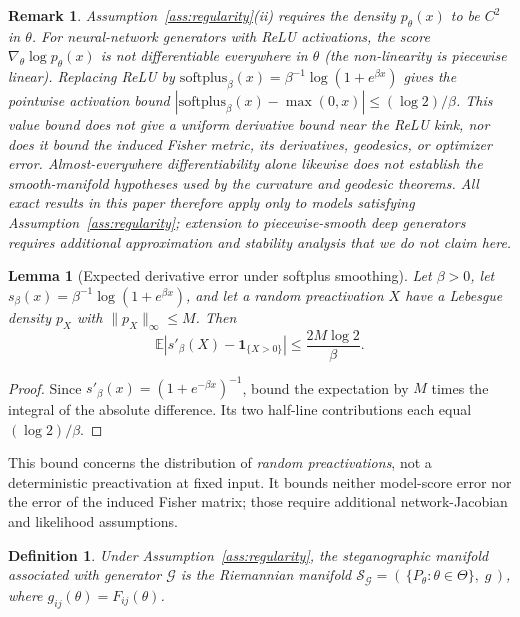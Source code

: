 \documentclass[a4paper,fleqn]{cas-dc}
\newtheorem{lemma}{Lemma}
\newtheorem{definition}{Definition}
\newtheorem{remark}{Remark}
\newcommand{\calS}{\mathcal{S}}
\newcommand{\calG}{\mathcal{G}}
\begin{document}
\begin{remark}%
  \label{rem:relu_smoothness}
  Assumption~\ref{ass:regularity}(ii) requires the density $p_\theta(x)$
  to be $C^2$ in $\theta$.  For neural-network generators with ReLU
  activations, the score $\nabla_\theta \log p_\theta(x)$ is not
  differentiable everywhere in $\theta$ (the non-linearity is piecewise
  linear). Replacing ReLU by
  $\mathrm{softplus}_\beta(x)=\beta^{-1}\log(1+e^{\beta x})$ gives the
  pointwise activation bound
  $|\mathrm{softplus}_\beta(x)-\max(0,x)|\leq(\log 2)/\beta$.
  This value bound does not give a uniform derivative bound near the ReLU
  kink, nor does it bound the induced Fisher metric, its derivatives,
  geodesics, or optimizer error. Almost-everywhere differentiability alone
  likewise does not establish the smooth-manifold hypotheses used by the
  curvature and geodesic theorems. All exact results in this paper therefore
  apply only to models satisfying Assumption~\ref{ass:regularity}; extension
  to piecewise-smooth deep generators requires additional approximation and
  stability analysis that we do not claim here.
\end{remark}


\begin{lemma}[Expected derivative error under softplus smoothing]
\label{lem:softplus_expectation}
Let $\beta>0$, let $s_\beta(x)=\beta^{-1}\log(1+e^{\beta x})$,
and let a random preactivation $X$ have a Lebesgue density $p_X$
with $\|p_X\|_\infty\le M$. Then
\begin{equation}
\mathbb E\!\left|s'_\beta(X)-\mathbf 1_{\{X>0\}}\right|
\le \frac{2M\log 2}{\beta}.
\label{eq:softplus_derivative_expectation}
\end{equation}
\end{lemma}
\begin{proof}
Since $s'_\beta(x)=(1+e^{-\beta x})^{-1}$, bound the expectation
by $M$ times the integral of the absolute difference. Its two
half-line contributions each equal $(\log 2)/\beta$.
\end{proof}
This bound concerns the distribution of \emph{random preactivations},
not a deterministic preactivation at fixed input. It bounds neither
model-score error nor the error of the induced Fisher matrix; those
require additional network-Jacobian and likelihood assumptions.

\begin{definition}%
  \label{def:stego_manifold}
  Under Assumption~\ref{ass:regularity}, the \emph{steganographic manifold}
  associated with generator $\calG$ is the Riemannian manifold
  $\calS_{\calG} = (\,\{P_\theta : \theta\in\Theta\},\; g\,)$,
  where $g_{ij}(\theta) = F_{ij}(\theta)$.
\end{definition}
\end{document}

